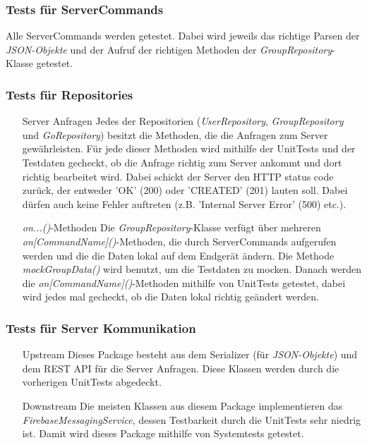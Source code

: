 \documentclass[11pt,a4paper]{scrartcl}
\begin{document}
\subsubsection{Tests für ServerCommands}
Alle ServerCommands werden getestet. Dabei wird jeweils das richtige Parsen der \textit{JSON-Objekte} und der Aufruf der richtigen Methoden der \textit{GroupRepository}-Klasse getestet.

\subsubsection{Tests für Repositories}
\begin{itemize}
	\item[Server Anfragen] Jedes der Repositorien (\textit{UserRepository}, \textit{GroupRepository} und \textit{GoRepository}) besitzt die Methoden, die die Anfragen zum Server gewährleisten. Für jede dieser Methoden wird mithilfe der UnitTests und der Testdaten gecheckt, ob die Anfrage richtig zum Server ankommt und dort richtig bearbeitet wird. Dabei schickt der Server den HTTP status code zurück, der entweder 'OK' (200) oder 'CREATED' (201) lauten soll. Dabei dürfen auch keine Fehler auftreten (z.B. 'Internal Server Error' (500) etc.).
	\item[\textit{on...()}-Methoden] Die \textit{GroupRepository}-Klasse verfügt über mehreren \textit{on[CommandName]()}-Methoden, die durch ServerCommands aufgerufen werden und die die Daten lokal auf dem Endgerät ändern. Die Methode \textit{mockGroupData()} wird benutzt, um die Testdaten zu mocken. Danach werden die \textit{on[CommandName]()}-Methoden mithilfe von UnitTests getestet, dabei wird jedes mal gecheckt, ob die Daten lokal richtig geändert werden.
\end{itemize}

\subsubsection{Tests für Server Kommunikation}
\begin{itemize}
	\item[Upstream] Dieses Package besteht aus dem Serializer (für \textit{JSON-Objekte}) und dem REST API für die Server Anfragen. Diese Klassen werden durch die vorherigen UnitTests abgedeckt.
	\item[Downstream] Die meisten Klassen aus diesem Package implementieren das \textit{FirebaseMessagingService}, dessen Testbarkeit durch die UnitTests sehr niedrig ist. Damit wird dieses Package mithilfe von Systemtests getestet.
\end{itemize}
\end{document}
